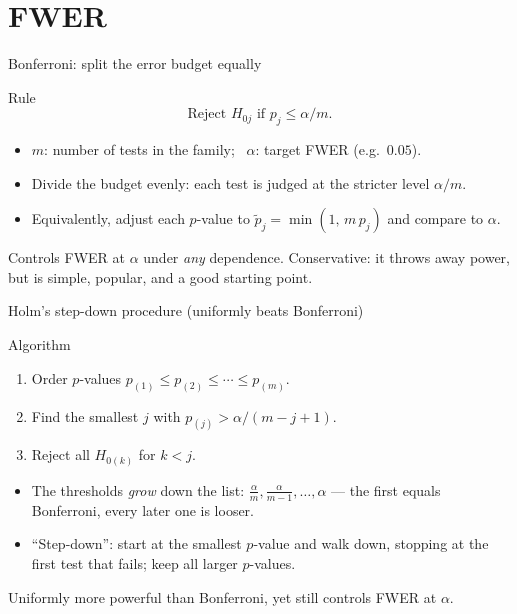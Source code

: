 \documentclass[aspectratio=169,11pt]{beamer}
\begin{document}
\section{FWER}

\begin{frame}{Bonferroni: split the error budget equally}
  \begin{block}{Rule}
    \[
      \boxed{\;\text{Reject } H_{0j} \text{ if } p_j \le \alpha / m.\;}
    \]
  \end{block}
  \begin{readme}
    \begin{itemize}
      \item $m$: number of tests in the family; \ $\alpha$: target FWER (e.g.\ $0.05$).
      \item Divide the budget evenly: each test is judged at the stricter level
            $\alpha/m$.
      \item Equivalently, adjust each $p$-value to $\tilde p_j=\min(1,\,m\,p_j)$ and
            compare to $\alpha$.
    \end{itemize}
  \end{readme}
  \begin{takeaway}
    Controls FWER at $\alpha$ under \emph{any} dependence. Conservative: it throws away
    power, but is simple, popular, and a good starting point.
  \end{takeaway}
\end{frame}

\begin{frame}{Holm's step-down procedure (uniformly beats Bonferroni)}
  \begin{block}{Algorithm}
    \begin{enumerate}
      \item Order $p$-values
            $p_{(1)} \le p_{(2)} \le \cdots \le p_{(m)}$.
      \item Find the smallest $j$ with
            $p_{(j)} > \alpha/(m - j + 1)$.
      \item Reject all $H_{0(k)}$ for $k < j$.
    \end{enumerate}
  \end{block}
  \begin{readme}
    \begin{itemize}
      \item The thresholds \emph{grow} down the list:
            $\tfrac{\alpha}{m},\tfrac{\alpha}{m-1},\dots,\alpha$ --- the first equals
            Bonferroni, every later one is looser.
      \item ``Step-down'': start at the smallest $p$-value and walk down, stopping at
            the first test that fails; keep all larger $p$-values.
    \end{itemize}
  \end{readme}
  \begin{takeaway}
    Uniformly more powerful than Bonferroni, yet still controls FWER at $\alpha$.
  \end{takeaway}
\end{frame}
\end{document}
